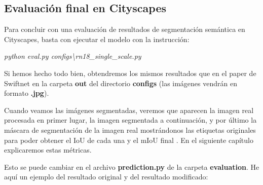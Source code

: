 \subsection{Evaluación final en Cityscapes}

Para concluir con una evaluación de resultados de segmentación semántica en Cityscapes, basta con ejecutar el modelo con la instrucción:

\begin{center}
\textit{python eval.py configs\textbackslash{rn18\_single\_scale.py}}
\end{center}

Si hemos hecho todo bien, obtendremos los mismos resultados que en el paper de Swiftnet \cite{swiftnet} en la carpeta \textbf{out} del directorio \textbf{configs} (las imágenes vendrán en formato \textbf{.jpg}).

Cuando veamos las imágenes segmentadas, veremos que aparecen la imagen real procesada en primer lugar, la imagen segmentada a continuación, y por último la máscara de segmentación de la imagen real mostrándonos las etiquetas originales para poder obtener el \ac{IoU} de cada una y el \ac{mIoU} final \cite{miou-iou}. En el siguiente capítulo explicaremos estas métricas.

Esto se puede cambiar en el archivo \textbf{prediction.py} de la carpeta \textbf{evaluation}. He aquí un ejemplo del resultado original y del resultado modificado:

